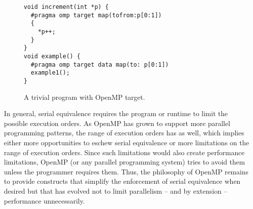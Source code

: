 \begin{figure}
\begin{verbatim}
void increment(int *p) {
  #pragma omp target map(tofrom:p[0:1])
  {
    *p++;
  }
}
void example() {
  #pragma omp target data map(to: p[0:1])
  example1();
}
\end{verbatim}
\caption{A trivial program with OpenMP target.\label{fig:trivial_target}}
\end{figure}

In general, serial equivalence requires the program or runtime to limit
the possible execution orders. As OpenMP has grown to support more parallel 
programming patterns, the range of execution orders has as well, which 
implies either more opportunities to eschew serial equivalence or more
limitations on the range of execution orders. Since such limitations would 
also create performance limitations, OpenMP (or any parallel programming 
system) tries to avoid them unless the programmer requires them. Thus, the 
philosophy of OpenMP remains to provide constructs that simplify the 
enforcement of serial equivalence when desired but that has evolved not 
to limit parallelism -- and by extension -- performance unnecessarily.

